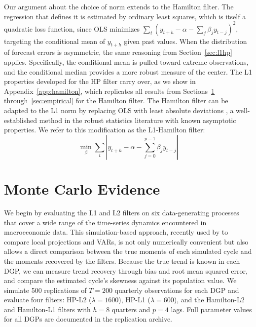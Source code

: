 \documentclass[10pt]{article}
\begin{document}
Our argument about the choice of norm extends to the Hamilton filter. The regression that defines it is estimated by ordinary least squares, which is itself a quadratic loss function, since OLS minimizes $\sum_t (y_{t+h} - \alpha - \sum_j \beta_j y_{t-j})^2$, targeting the conditional mean of $y_{t+h}$ given past values. When the distribution of forecast errors is asymmetric, the same reasoning from Section~\ref{sec:l1hp} applies. Specifically, the conditional mean is pulled toward extreme observations, and the conditional median provides a more robust measure of the center. The L1 properties developed for the HP filter carry over, as we show in Appendix~\ref{app:hamilton}, which replicates all results from Sections~\ref{sec:montecarlo} through~\ref{sec:empirical} for the Hamilton filter. The Hamilton filter can be adapted to the L1 norm by replacing OLS with least absolute deviations \citep{koenker_bassett1978, koenker2005}, a well-established method in the robust statistics literature with known asymptotic properties. We refer to this modification as the L1-Hamilton filter:
\begin{equation}
\label{eq:hamilton_l1}
\min_{\beta} \sum_{t} \left| y_{t+h} - \alpha - \sum_{j=0}^{p-1} \beta_j y_{t-j} \right|
\end{equation}


\section{Monte Carlo Evidence}
\label{sec:montecarlo}

We begin by evaluating the L1 and L2 filters on six data-generating processes that cover a wide range of the time-series dynamics encountered in macroeconomic data. This simulation-based approach, recently used by \citet{li_etal2024} to compare local projections and VARs, is not only numerically convenient but also allows a direct comparison between the true moments of each simulated cycle and the moments recovered by the filters. Because the true trend is known in each DGP, we can measure trend recovery through bias and root mean squared error, and compare the estimated cycle's skewness against its population value. We simulate 500 replications of $T = 200$ quarterly observations for each DGP and evaluate four filters: HP-L2 ($\lambda = 1600$), HP-L1 ($\lambda = 600$), and the Hamilton-L2 and Hamilton-L1 filters with $h = 8$ quarters and $p = 4$ lags. Full parameter values for all DGPs are documented in the replication archive.
\end{document}
